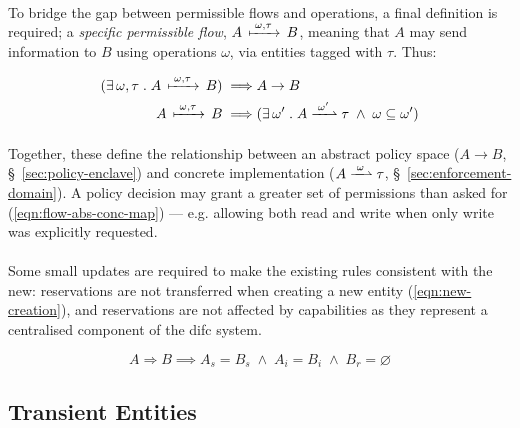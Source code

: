 \paragraph{} To bridge the gap between permissible flows and operations, a final definition is required; a \textit{specific permissible flow}, $A \,\xmapsto{\;\omega,\tau\;}\, B$, meaning that $A$ may send information to $B$ using operations $\omega$, via entities tagged with $\tau$. Thus:

\vspace{-7mm}
\begin{align}
    (\exists\, \omega,\tau \;.\; A \,\xmapsto{\;\omega,\tau\;}\, B) \implies & A \rightarrow B \\
    A \,\xmapsto{\;\omega,\tau\;}\, B \implies & (\exists \,\omega' \;.\; A \xrightharpoonup{\;\omega'\;} \tau \;\land\; \omega \subseteq \omega') \label{eqn:flow-abs-conc-map}
\end{align}

\paragraph{} Together, these define the relationship between an abstract policy space ($A \rightarrow B$, §~\ref{sec:policy-enclave}) and concrete implementation ($A \xrightharpoonup{\;\omega\;} \tau$, §~\ref{sec:enforcement-domain}). A policy decision may grant a greater set of permissions than asked for (\ref{eqn:flow-abs-conc-map}) --- e.g. allowing both read and write when only write was explicitly requested.~\cite{flume,Zeldovich2008}

\paragraph{} Some small updates are required to make the existing rules consistent with the new: reservations are not transferred when creating a new entity (\ref{eqn:new-creation}), and reservations are not affected by capabilities as they represent a centralised component of the \acrshort{difc} system. 

\vspace{-5mm}
\begin{equation}
    A \Rightarrow B \implies A_s = B_s \; \wedge \; A_i = B_i \; \wedge \; B_r = \varnothing \label{eqn:new-creation}
\end{equation}


\subsection{Transient Entities}
\label{sec:transient-entities}

